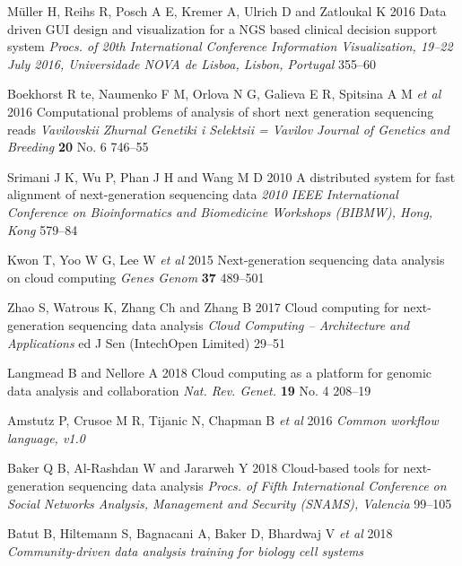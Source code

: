 \documentclass[a4paper]{jpconf}
\begin{document}
\begin{thebibliography}{0}
 Müller H, Reihs R, Posch A E, Kremer A, Ulrich D and Zatloukal K 2016 Data driven GUI design and visualization for a NGS based clinical decision support system \emph{Procs. of 20th International Conference Information Visualization, 19--22 July 2016, Universidade NOVA de Lisboa, Lisbon, Portugal} 355--60 

 Boekhorst R te, Naumenko F M, Orlova N G, Galieva E R, Spitsina A M \emph{et al} 2016 Computational problems of analysis of short next generation sequencing reads \emph{Vavilovskii Zhurnal Genetiki i Selektsii = Vavilov Journal of Genetics and Breeding} \textbf{20} No. 6 746--55 

 Srimani J K, Wu P, Phan J H and Wang M D 2010 A distributed system for fast alignment of next-generation sequencing data \emph{2010 IEEE International Conference on Bioinformatics and Biomedicine Workshops (BIBMW), Hong, Kong} 579--84 

 Kwon T, Yoo W G, Lee W \emph{et al} 2015 Next-generation sequencing data analysis on cloud computing \emph{Genes Genom} \textbf{37} 489--501 

 Zhao S, Watrous K, Zhang Ch and Zhang B 2017 Cloud computing for next-generation sequencing data analysis \emph{Cloud Computing -- Architecture and Applications} ed J Sen (IntechOpen Limited) 29--51 

 Langmead B and Nellore A 2018 Cloud computing as a platform for genomic data analysis and collaboration \emph{Nat. Rev. Genet.} \textbf{19} No. 4 208--19 

 Amstutz P, Crusoe M R, Tijanic N, Chapman B \emph{et al} 2016 \emph{Common workflow language, v1.0} 

 Baker Q B,  Al-Rashdan W and Jararweh Y 2018 Cloud-based tools for next-generation sequencing data analysis \emph{Procs. of Fifth International Conference on Social Networks Analysis, Management and Security (SNAMS), Valencia} 99--105 


 Batut B, Hiltemann S, Bagnacani A, Baker D, Bhardwaj V \emph{et al} 2018 \emph{Community-driven data analysis training for biology cell systems} 


\end{thebibliography}
\end{document}
